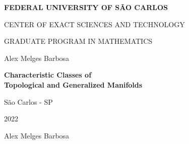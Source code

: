 \documentclass[12pt,oneside]{book}
\begin{document}
\selectfont

\begin{titlepage}
    \begin{center}
        \textbf{FEDERAL UNIVERSITY OF SÃO CARLOS}
    \end{center}

    \vspace{-0.8cm}

    \begin{center}  
        \fontsize{10}{12}\selectfont CENTER OF EXACT SCIENCES AND TECHNOLOGY
    \end{center}

    \vspace{-0.8cm}

    \begin{center}
        \fontsize{10}{12}\selectfont GRADUATE PROGRAM IN MATHEMATICS
    \end{center}

    \vspace{3cm}

    \begin{center}
        \small{Alex Melges Barbosa}
    \end{center}

    \vspace{3cm}

    \begin{center}
        \Large{\textbf{Characteristic Classes of \\ Topological and Generalized Manifolds}}
    \end{center}

    \vspace{10cm}

    \begin{center}
        São Carlos - SP
    \end{center}

    \vspace{-0.8cm}

    \begin{center}
        2022
    \end{center}
\end{titlepage}



\newpage
\thispagestyle{empty}

\begin{center}
    \small{Alex Melges Barbosa}
\end{center}

\vspace{3cm}
\end{document}
